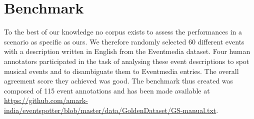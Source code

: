 \documentclass[10pt,a4paper]{article}
\begin{document}
\section{Benchmark}
To the best of our knowledge no corpus exists to assess the performances in a scenario as specific as ours. We therefore randomly selected 60 different events with a description written in English from the Eventmedia dataset. Four human annotators participated in the task of analysing these event descriptions to spot musical events and to disambiguate them to Eventmedia entries. The overall agreement score they achieved was good. The benchmark thus created was composed of 115 event annotations and has been made available at \url{https://github.com/amark-india/eventspotter/blob/master/data/GoldenDataset/GS-manual.txt}.

\end{document}
